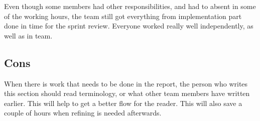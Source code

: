 Even though some members had other responsibilities, and had to absent in some of the working hours, the team still got everything from implementation part done in time for the sprint review. Everyone worked really well independently, as well as in team. 



\subsection{Cons}

When there is work that needs to be done in the report, the person who writes this section should read terminology, or what other team members have written earlier. 
This will help to get a better flow for the reader.
This will also save a couple of hours when refining is needed afterwards. 
